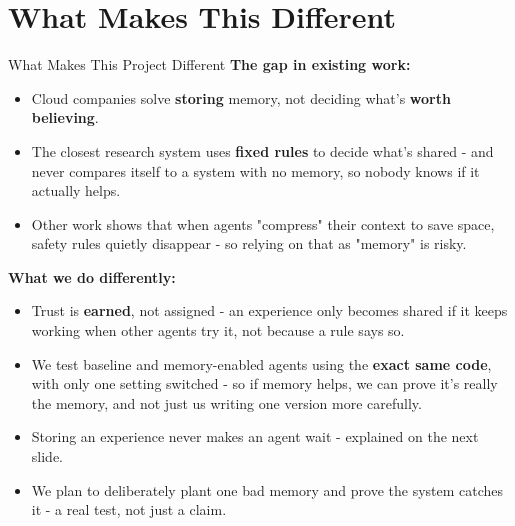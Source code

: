 \documentclass{beamer}
\begin{document}
\section{What Makes This Different}
\begin{frame}{What Makes This Project Different}
    \textbf{The gap in existing work:}
    \begin{itemize}
        \item Cloud companies solve \textbf{storing} memory, not deciding what's \textbf{worth believing}.
        \item The closest research system uses \textbf{fixed rules} to decide what's shared - and never compares itself to a system with no memory, so nobody knows if it actually helps.
        \item Other work shows that when agents "compress" their context to save space, safety rules quietly disappear - so relying on that as "memory" is risky.
    \end{itemize}

    \vspace{0.25cm}
    \textbf{What we do differently:}
    \begin{itemize}
        \item Trust is \textbf{earned}, not assigned - an experience only becomes shared if it keeps working when other agents try it, not because a rule says so.
        \item We test baseline and memory-enabled agents using the \textbf{exact same code}, with only one setting switched - so if memory helps, we can prove it's really the memory, and not just us writing one version more carefully.
        \item Storing an experience never makes an agent wait - explained on the next slide.
        \item We plan to deliberately plant one bad memory and prove the system catches it - a real test, not just a claim.
    \end{itemize}
\end{frame}

\end{document}
